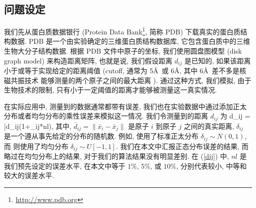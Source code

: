 \documentclass{CASthesis_zzk}
\begin{document}
\subsection{问题设定}
\label{sec:ProbSet}
我们先从蛋白质数据银行 (Protein Data Bank\footnote{\url{http://www.pdb.org}}, 
简称 PDB) \cite{Berman2000} 下载真实的蛋白质结构数据.
PDB 是一个由实验确定的三维蛋白质结构数据库, 
它包含蛋白质中的三维生物大分子结构数据.
根据 PDB 文件中原子的坐标, 我们使用圆盘图模型 (disk graph model) 来构造距离矩阵,
也就是说, 我们假设距离 $d_{ij}$ 是已知的, 
如果该距离小于或等于实现给定的距离阈值 
(cutoff, 通常为 5\AA ~或 6\AA, 其中 6\AA ~差不多是核磁共振技术
能够测量的两个原子之间的最大距离 \cite{Biswas2008}). 
通过这种方式, 我们模拟, 由于生物技术的限制,
只有小于一定阈值的距离才能够被测量这一真实情况.

在实际应用中, 测量到的数据通常都带有误差,
我们也在实验数据中通过添加正太分布或者均匀分布的乘性误差来模拟这一情况.
我们令测量到的距离 $d_{ij}$ 为
\be d_{ij} = \bar{d}_{ij}(1+\delta_{ij}*nl), \label{dij} \ee
其中, $\bar{d}_{ij}=\|\bar{x}_i-\bar{x}_j\|$ 是原子 $i$ 到原子 $j$ 之间的真实距离,
$\delta_{ij}$ 是一个遵从事先给定的分布的随机数.
例如, \cite{Biswas2008} 使用了标准正太分布 $\delta_{ij} \sim N(0,1)$,
而 \cite{Sit2009} 则使用了均匀分布 $\delta_{ij} \sim U[-1,1]$. 
我们在本文中汇报正态分布误差的结果, 
而略过在均匀分布上的结果, 对于我们的算法结果没有明显差别.
在 (\ref{dij}) 中,  $nl$ 是我们预先设定的误差水平,
在本文中等于 $1\%$, $5\%$, 或 $10\%$,
分别代表较小, 中等和较大的误差水平.
\end{document}
